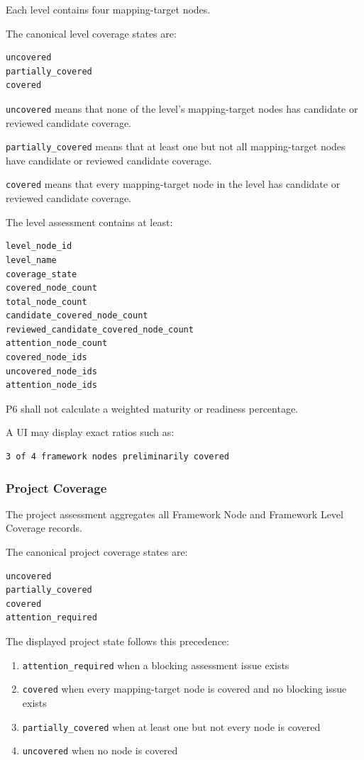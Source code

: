 Each level contains four mapping-target nodes.

The canonical level coverage states are:

\begin{verbatim}
uncovered
partially_covered
covered
\end{verbatim}

\texttt{uncovered} means that none of the level's mapping-target nodes has candidate or reviewed candidate coverage.

\texttt{partially\_covered} means that at least one but not all mapping-target nodes have candidate or reviewed candidate coverage.

\texttt{covered} means that every mapping-target node in the level has candidate or reviewed candidate coverage.

The level assessment contains at least:

\begin{verbatim}
level_node_id
level_name
coverage_state
covered_node_count
total_node_count
candidate_covered_node_count
reviewed_candidate_covered_node_count
attention_node_count
covered_node_ids
uncovered_node_ids
attention_node_ids
\end{verbatim}

P6 shall not calculate a weighted maturity or readiness percentage.

A UI may display exact ratios such as:

\begin{verbatim}
3 of 4 framework nodes preliminarily covered
\end{verbatim}

\hypertarget{project-coverage}{%
\subsubsection{Project Coverage}\label{project-coverage}}

The project assessment aggregates all Framework Node and Framework Level Coverage records.

The canonical project coverage states are:

\begin{verbatim}
uncovered
partially_covered
covered
attention_required
\end{verbatim}

The displayed project state follows this precedence:

\begin{enumerate}
\def\labelenumi{\arabic{enumi}.}
\tightlist
\item
  \texttt{attention\_required} when a blocking assessment issue exists
\item
  \texttt{covered} when every mapping-target node is covered and no blocking issue exists
\item
  \texttt{partially\_covered} when at least one but not every node is covered
\item
  \texttt{uncovered} when no node is covered
\end{enumerate}

